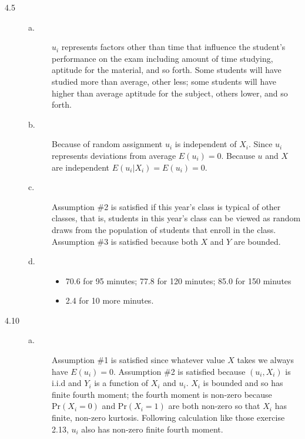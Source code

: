 \documentclass[a4paper,11pt]{article}
\newcommand{\pr}{\mathrm{Pr}}
\begin{document}
\begin{description}
\item[{4.5}] \begin{description}
\item[{a.}] \(u_i\) represents factors other than time that influence the
student’s performance on the exam including amount of time
studying, aptitude for the material, and so forth. Some
students will have studied more than average, other less;
some students will have higher than average aptitude for the
subject, others lower, and so forth.
\item[{b.}] Because of random assignment \(u_i\) is independent of
\(X_i\). Since \(u_i\) represents deviations from average
\(E(u_i)=0\). Because \(u\) and \(X\) are independent \(E(u_i|X_i)
          = E(u_i)=0\).
\item[{c.}] Assumption \#2 is satisfied if this year's class is typical
of other classes, that is, students in this year's class can
be viewed as random draws from the population of students
that enroll in the class. Assumption \#3 is satisfied because
both \(X\) and \(Y\) are bounded.
\item[{d.}] \begin{itemize}
\item 70.6 for 95 minutes; 77.8 for 120 minutes; 85.0 for 150 minutes
\item 2.4 for 10 more minutes.
\end{itemize}
\end{description}

\item[{4.10}] \begin{description}
\item[{a.}] Assumption \#1 is satisfied since whatever value \(X\) takes we
always have \(E(u_i) = 0\). Assumption \#2 is satisfied because
\((u_i, X_i)\) is i.i.d and \(Y_i\) is a function of \(X_i\) and
\(u_i\). \(X_i\) is bounded and so has finite fourth moment; the
fourth moment is non-zero because \(\pr(X_i = 0)\) and
\(\pr(X_i = 1)\) are both non-zero so that \(X_i\) has finite,
non-zero kurtosis. Following calculation like those exercise
2.13, \(u_i\) also has non-zero finite fourth moment.


\end{description}
\end{description}
\end{document}
